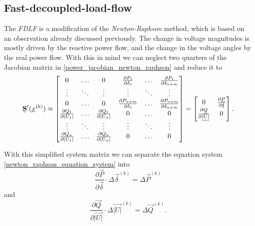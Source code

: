 \subsection{Fast-decoupled-load-flow}
\label{sec:fdlf}

The \emph{FDLF} is a modification of the \emph{Newton-Raphson} method, which is based on an observation already discussed previously. The change in voltage magnitudes is mostly driven by the reactive power flow, and the change in the voltage angles by the real power flow. With this in mind we can neglect two quarters of the Jacobian matrix in \eqref{power_jacobian_newton_raphson} and reduce it to
\begin{equation}
	\mat S' (\vec x^{(k)}) \approx 
	\begin{bmatrix}
		0	& \hdots	& 0	& \frac{\partial P_1}{\partial \delta_1}	& \hdots	& \frac{\partial P_1}{\partial \delta_{n + m}} \\
		\vdots								& \ddots	& \vdots								& \vdots									& \ddots	& \vdots \\
		0	& \hdots	& 0	& \frac{\partial P_{n + m}}{\partial \delta_1}	& \hdots	& \frac{\partial P_{n + m}}{\partial \delta_{n + m}} \\
		\frac{\partial Q_1}{\partial |U_1|}	& \hdots	& \frac{\partial Q_1}{\partial |U_n|}	& 0	& \hdots	& 0 \\
		\vdots								& \ddots	& \vdots								& \vdots									& \ddots	& \vdots \\
		\frac{\partial Q_n}{\partial |U_1|}	& \hdots	& \frac{\partial Q_n}{\partial |U_n|}	& 0	& \hdots	& 0
	\end{bmatrix} =
	\begin{bmatrix}
		0								&	\frac{\partial \vec P}{\partial \vec \delta} \\
		\frac{\partial \vec Q}{\partial \vec{|U|}}	&	0
	\end{bmatrix}.
\end{equation}

With this simplified system matrix we can separate the equation system \eqref{newton_raphson_equation_system} into
\begin{equation}
	\frac{\partial \vec P}{\partial \vec \delta} \cdot \Delta \vec \delta^{(k)} = \Delta \vec P^{(k)}
\end{equation}
and
\begin{equation}
	\frac{\partial \vec Q}{\partial \vec{|U|}} \cdot \Delta \vec{|U|}^{(k)} = \Delta \vec Q^{(k)}.
\end{equation}

